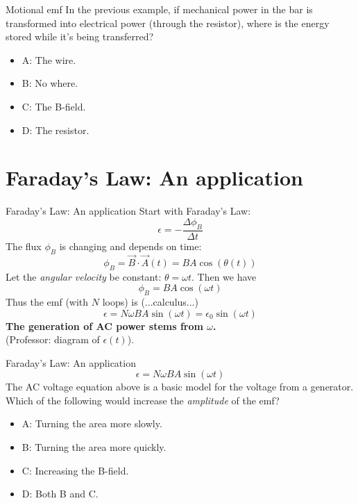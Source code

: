 \documentclass{beamer}
\begin{document}
\begin{frame}{Motional emf}
In the previous example, if mechanical power in the bar is transformed into electrical power (through the resistor), where is the energy stored while it's being transferred?
\begin{itemize}
\item A: The wire.
\item B: No where.
\item C: The B-field.
\item D: The resistor.
\end{itemize}
\end{frame}

\section{Faraday's Law: An application}

\begin{frame}{Faraday's Law: An application}
Start with Faraday's Law:
\begin{equation}
\epsilon = - \frac{\Delta \phi_B}{\Delta t}
\end{equation}
The flux $\phi_B$ is changing and depends on time:
\begin{equation}
\phi_B = \vec{B} \cdot \vec{A}(t) = BA\cos(\theta(t))
\end{equation}
Let the \textit{angular velocity} be constant: $\theta = \omega t$.  Then we have
\begin{equation}
\phi_B  = BA\cos(\omega t)
\end{equation}
Thus the emf (with $N$ loops) is (...calculus...)
\begin{equation}
\epsilon = N\omega BA \sin(\omega t) = \epsilon_0 \sin(\omega t)
\end{equation}
\textbf{The generation of AC power stems from $\omega$.} \\ (Professor: diagram of $\epsilon(t)$).
\end{frame}

\begin{frame}{Faraday's Law: An application}
\begin{equation}
\epsilon = N\omega BA \sin(\omega t)
\end{equation}
The AC voltage equation above is a basic model for the voltage from a generator.  Which of the following would increase the \textit{amplitude} of the emf?
\begin{itemize}
\item A: Turning the area more slowly.
\item B: Turning the area more quickly.
\item C: Increasing the B-field.
\item D: Both B and C.
\end{itemize}
\end{frame}
\end{document}
